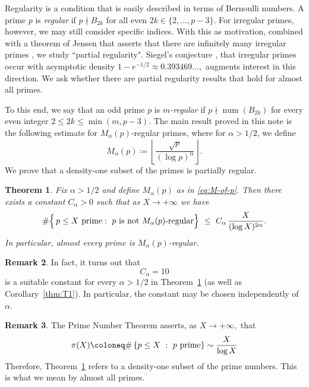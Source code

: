 \documentclass[12pt]{amsart}
\theoremstyle{plain}
\newtheorem{theorem}{Theorem}[section]
\theoremstyle{definition}
\newtheorem{remark}[theorem]{Remark}
\DeclareMathOperator{\num}{num}
\begin{document}
Regularity is a condition that is easily described in terms of Bernoulli numbers.
A prime $p$ is \emph{regular} if $p \nmid B_{2k}$ for all even $2k \in \{2, \dots, p-3\}$.
For irregular primes, however, we may still consider specific indices.
With this as motivation, combined with a theorem of Jensen that asserts that
there are infinitely many irregular primes \cite{Jensen},  we study ``partial regularity".
Siegel's conjecture \cite{Siegel},
that irregular primes occur with asymptotic density
$1-e^{-1/2}\approx 0.393469\dots,$ augments interest in this direction.
We ask whether there are partial regularity results that hold for almost all primes.

To this end,  we say that an odd prime $p$ is \emph{$m$-regular} if
$p\nmid \num(B_{2k})$ for every even integer $2\le 2k\le \min \left (m, p-3\right).$
The main result proved in this note is the following estimate for $M_{\alpha}(p)$-regular primes,
where  for $\alpha>1/2$, we define
\begin{equation}\label{eq:M-of-p}
M_{\alpha}(p) \coloneq \left\lfloor \frac{\sqrt{p}}{(\log p)^{\alpha}}\right\rfloor.
\end{equation}
We prove that a density-one subset of the primes is partially regular.

\begin{theorem}\label{thm:T2}
Fix $\alpha> 1/2$ and define $M_{\alpha}(p)$ as in \eqref{eq:M-of-p}.
Then there exists a constant $C_{\alpha}>0$ such that as $X\rightarrow +\infty$ we have
\[
\#\Bigl\{\,p\le X \text{ prime}:\ p\ \text{is not $M_{\alpha}(p)$-regular}\Bigr\}
\ \le\ C_{\alpha}\,\frac{X}{(\log X)^{2\alpha}}.
\]
In particular, almost every prime is $M_{\alpha}(p)$-regular.
\end{theorem}

\begin{remark}
  \label{rem:ten}
  In fact, it turns out that
  \[ C_\alpha = 10 \]
  is a suitable constant for every $\alpha > 1/2$ in Theorem~\ref{thm:T2} (as well as Corollary~\ref{thm:T1}).
  In particular, the constant
  may be chosen independently of $\alpha$.
\end{remark}

\begin{remark}
The Prime Number Theorem asserts, as $X\rightarrow +\infty,$ that
\[ \pi(X) \coloneq \# \left \{ p\leq X \ : \ p \ {\text {\rm prime}}\right \}\sim \frac{X}{\log X} \]
Therefore, Theorem~\ref{thm:T2} refers to a density-one subset of the prime numbers.
This is what we mean by almost all primes.
\end{remark}
\end{document}
